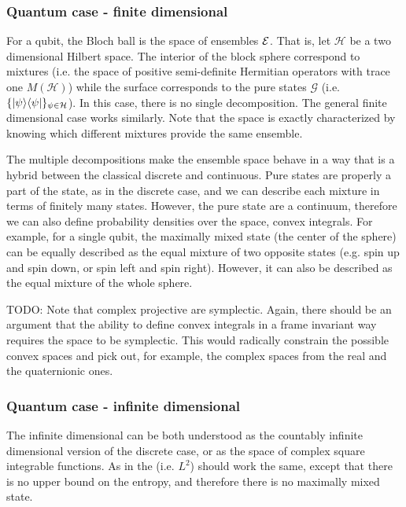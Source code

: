 \subsubsection{Quantum case - finite dimensional}

For a qubit, the Bloch ball is the space of ensembles $\mathcal{E}$. That is, let $\mathcal{H}$ be a two dimensional Hilbert space. The interior of the block sphere correspond to mixtures (i.e. the space of positive semi-definite Hermitian operators with trace one $M(\mathcal{H})$) while the surface corresponds to the pure states $\mathcal{G}$ (i.e. $\{ |\psi\rangle \langle\psi| \}_{\psi \in \mathcal{H}}$). In this case, there is no single decomposition. The general finite dimensional case works similarly. Note that the space is exactly characterized by knowing which different mixtures provide the same ensemble.

The multiple decompositions make the ensemble space behave in a way that is a hybrid between the classical discrete and continuous. Pure states are properly a part of the state, as in the discrete case, and we can describe each mixture in terms of finitely many states. However, the pure state are a continuum, therefore we can also define probability densities over the space, convex integrals. For example, for a single qubit, the maximally mixed state (the center of the sphere) can be equally described as the equal mixture of two opposite states (e.g. spin up and spin down, or spin left and spin right). However, it can also be described as the equal mixture of the whole sphere.

TODO: Note that complex projective are symplectic. Again, there should be an argument that the ability to define convex integrals in a frame invariant way requires the space to be symplectic. This would radically constrain the possible convex spaces and pick out, for example, the complex spaces from the real and the quaternionic ones.

\subsubsection{Quantum case - infinite dimensional}

The infinite dimensional can be both understood as the countably infinite dimensional version of the discrete case, or as the space of complex square integrable functions. As in the  (i.e. $L^2$) should work the same, except that there is no upper bound on the entropy, and therefore there is no maximally mixed state.

